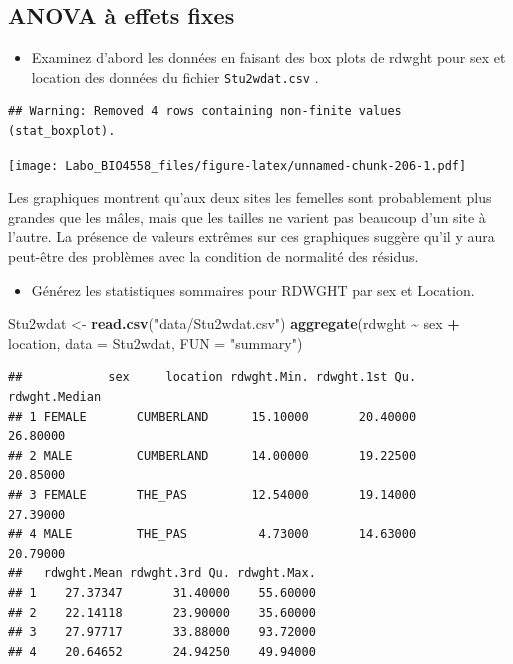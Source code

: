 \documentclass[
  12pt,
]{book}
\newenvironment{Shaded}{\begin{snugshade}}{\end{snugshade}}
\newcommand{\DataTypeTok}[1]{\textcolor[rgb]{0.13,0.29,0.53}{#1}}
\newcommand{\KeywordTok}[1]{\textcolor[rgb]{0.13,0.29,0.53}{\textbf{#1}}}
\newcommand{\NormalTok}[1]{#1}
\newcommand{\OperatorTok}[1]{\textcolor[rgb]{0.81,0.36,0.00}{\textbf{#1}}}
\newcommand{\StringTok}[1]{\textcolor[rgb]{0.31,0.60,0.02}{#1}}
\providecommand{\tightlist}{%
  \setlength{\itemsep}{0pt}\setlength{\parskip}{0pt}}
\begin{document}
\hypertarget{anova-uxe0-effets-fixes}{%
\subsection{ANOVA à effets fixes}\label{anova-uxe0-effets-fixes}}

\begin{itemize}
\tightlist
\item
  Examinez d'abord les données en faisant des box plots de rdwght pour sex et location des données du fichier \texttt{Stu2wdat.csv} .
\end{itemize}

\begin{verbatim}
## Warning: Removed 4 rows containing non-finite values (stat_boxplot).
\end{verbatim}

\texttt{[image: Labo\_BIO4558\_files/figure-latex/unnamed-chunk-206-1.pdf]}

Les graphiques montrent qu'aux deux sites les femelles sont probablement plus grandes que les mâles, mais que les tailles ne varient pas beaucoup d'un site à l'autre. La présence de valeurs extrêmes sur ces graphiques suggère qu'il y aura peut-être des problèmes avec la condition de normalité des résidus.

\begin{itemize}
\tightlist
\item
  Générez les statistiques sommaires pour RDWGHT par sex et Location.
\end{itemize}

\begin{Shaded}
\begin{Highlighting}[]
\NormalTok{Stu2wdat \textless{}{-}}\StringTok{ }\KeywordTok{read.csv}\NormalTok{(}\StringTok{"data/Stu2wdat.csv"}\NormalTok{)}
\KeywordTok{aggregate}\NormalTok{(rdwght }\OperatorTok{\textasciitilde{}}\StringTok{ }\NormalTok{sex }\OperatorTok{+}\StringTok{ }\NormalTok{location, }\DataTypeTok{data =}\NormalTok{ Stu2wdat, }\DataTypeTok{FUN =} \StringTok{"summary"}\NormalTok{)}
\end{Highlighting}
\end{Shaded}

\begin{verbatim}
##            sex     location rdwght.Min. rdwght.1st Qu. rdwght.Median
## 1 FEMALE       CUMBERLAND      15.10000       20.40000      26.80000
## 2 MALE         CUMBERLAND      14.00000       19.22500      20.85000
## 3 FEMALE       THE_PAS         12.54000       19.14000      27.39000
## 4 MALE         THE_PAS          4.73000       14.63000      20.79000
##   rdwght.Mean rdwght.3rd Qu. rdwght.Max.
## 1    27.37347       31.40000    55.60000
## 2    22.14118       23.90000    35.60000
## 3    27.97717       33.88000    93.72000
## 4    20.64652       24.94250    49.94000
\end{verbatim}
\end{document}
